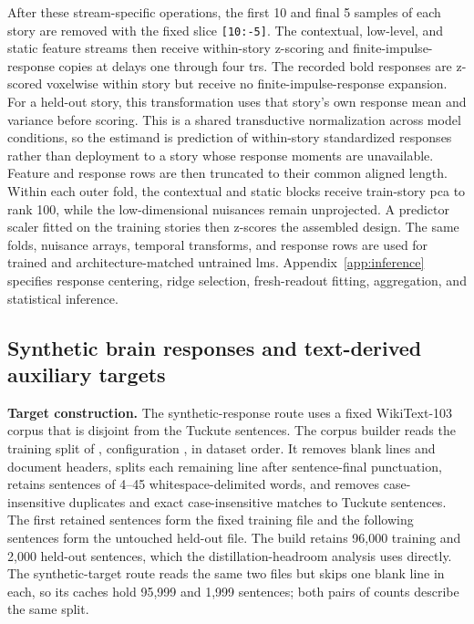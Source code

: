 After these stream-specific operations, the first 10 and final 5 samples of each story are removed with the fixed slice \texttt{[10:-5]}.
The contextual, low-level, and static feature streams then receive within-story z-scoring and finite-impulse-response copies at delays one through four \acp{tr}.
The recorded \ac{bold} responses are z-scored voxelwise within story but receive no finite-impulse-response expansion.
For a held-out story, this transformation uses that story's own response mean and variance before scoring.
This is a shared transductive normalization across model conditions, so the estimand is prediction of within-story standardized responses rather than deployment to a story whose response moments are unavailable.
Feature and response rows are then truncated to their common aligned length.
Within each outer fold, the contextual and static blocks receive train-story \ac{pca} to rank 100, while the low-dimensional nuisances remain unprojected.
A predictor scaler fitted on the training stories then z-scores the assembled design.
The same folds, nuisance arrays, temporal transforms, and response rows are used for trained and architecture-matched untrained \acp{lm}. 
Appendix~\ref{app:inference} specifies response centering, ridge selection, fresh-readout fitting, aggregation, and statistical inference.

\subsection{Synthetic brain responses and text-derived auxiliary targets}

\noindent\textbf{Target construction.}
The synthetic-response route uses a fixed WikiText-103 corpus that is disjoint from the Tuckute sentences.
The corpus builder reads the training split of , configuration , in dataset order.
It removes blank lines and document headers, splits each remaining line after sentence-final punctuation, retains sentences of 4--45 whitespace-delimited words, and removes case-insensitive duplicates and exact case-insensitive matches to Tuckute sentences.
The first retained sentences form the fixed training file and the following sentences form the untouched held-out file.
The build retains 96,000 training and 2,000 held-out sentences, which the distillation-headroom analysis uses directly.
The synthetic-target route reads the same two files but skips one blank line in each, so its caches hold 95,999 and 1,999 sentences; both pairs of counts describe the same split. 

